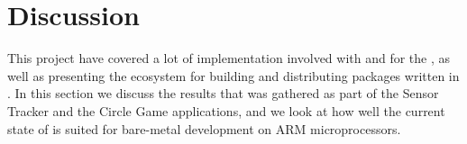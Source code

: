 
\chapter{Discussion}
\label{chap:discussion}

This project have covered a lot of implementation involved with {\rust} and {\C} for the {\gecko}, as well as presenting the ecosystem for building and distributing packages written in {\rust}.
In this section we discuss the results that was gathered as part of the Sensor Tracker and the Circle Game applications, and we look at how well the current state of {\rust} is suited for bare-metal development on ARM microprocessors.






%
